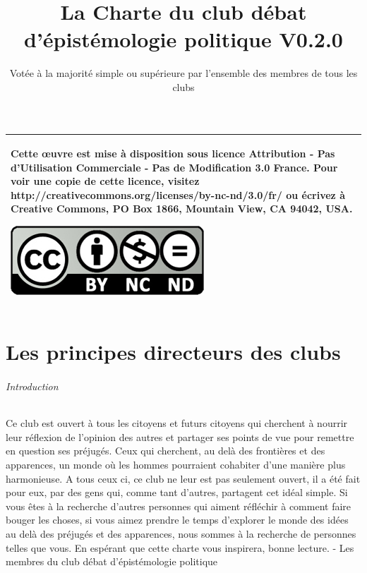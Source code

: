 \documentclass[a4paper,11pt]{article}
\title{\Huge{La Charte du club débat d'épistémologie politique} \LARGE{V0.2.0}}
\author{Votée à la majorité simple ou supérieure par l'ensemble des membres de tous les clubs}
\begin{document}
\maketitle

\begin{tabular}{|p{}|}
 \hline
 Cette œuvre est mise à disposition sous licence Attribution - Pas d’Utilisation Commerciale - Pas de Modification 3.0 France. Pour voir une copie de cette licence, visitez http://creativecommons.org/licenses/by-nc-nd/3.0/fr/ ou écrivez à Creative Commons, PO Box 1866, Mountain View, CA 94042, USA.
 \begin{center}
 \includegraphics[scale=1]{cc.jpg}
 \end{center}\\
 \hline
\end{tabular}
\newpage
\tableofcontents
\newpage

\part{Les principes directeurs des clubs}
\paragraph{Introduction}
Ce club est ouvert à tous les citoyens et futurs citoyens qui cherchent à nourrir leur réflexion de l'opinion des autres et partager ses points de vue pour remettre en question ses préjugés. Ceux qui cherchent, au delà des frontières et des apparences, un monde où les hommes pourraient cohabiter d'une manière plus harmonieuse. A tous ceux ci, ce club ne leur est pas seulement ouvert, il a été fait pour eux, par des gens qui, comme tant d'autres, partagent cet idéal simple. Si vous êtes à la recherche d'autres personnes qui aiment réfléchir à comment faire bouger les choses, si vous aimez prendre le temps d'explorer le monde des idées au delà des préjugés et des apparences, nous sommes à la recherche de personnes telles que vous. En espérant que cette charte vous inspirera, bonne lecture. - Les membres du club débat d'épistémologie politique
\end{document}

